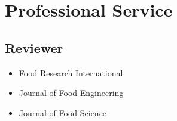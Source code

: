 \documentclass[11pt, a4paper]{awesome-cv}
\providecommand{\tightlist}{%
	\setlength{\itemsep}{0pt}\setlength{\parskip}{0pt}}
\begin{document}
\begin{cventries}
\end{cventries}

\hypertarget{professional-service}{%
\section{Professional Service}\label{professional-service}}

\hypertarget{reviewer}{%
\subsection{Reviewer}\label{reviewer}}

\begin{itemize}
\tightlist
\item
  Food Research International
\item
  Journal of Food Engineering
\item
  Journal of Food Science
\end{itemize}
\end{document}
